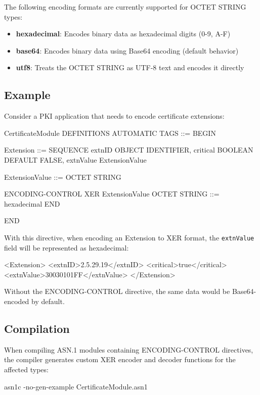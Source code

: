 \documentclass[english,oneside,12pt]{book}
\begin{document}
The following encoding formats are currently supported for OCTET STRING types:

\begin{itemize}
\item \textbf{hexadecimal}: Encodes binary data as hexadecimal digits (0-9, A-F)
\item \textbf{base64}: Encodes binary data using Base64 encoding (default behavior)
\item \textbf{utf8}: Treats the OCTET STRING as UTF-8 text and encodes it directly
\end{itemize}

\subsection*{Example}

Consider a PKI application that needs to encode certificate extensions:

\begin{asn}
CertificateModule DEFINITIONS AUTOMATIC TAGS ::= BEGIN

Extension ::= SEQUENCE {
    extnID      OBJECT IDENTIFIER,
    critical    BOOLEAN DEFAULT FALSE,
    extnValue   ExtensionValue
}

ExtensionValue ::= OCTET STRING

ENCODING-CONTROL XER
    ExtensionValue OCTET STRING ::= hexadecimal
END

END
\end{asn}

With this directive, when encoding an Extension to XER format, the \texttt{extnValue} 
field will be represented as hexadecimal:

\begin{example}
<Extension>
    <extnID>2.5.29.19</extnID>
    <critical>true</critical>
    <extnValue>30030101FF</extnValue>
</Extension>
\end{example}

Without the ENCODING-CONTROL directive, the same data would be Base64-encoded by default.

\subsection*{Compilation}

When compiling ASN.1 modules containing ENCODING-CONTROL directives, the compiler 
generates custom XER encoder and decoder functions for the affected types:

\begin{bash}
asn1c -no-gen-example CertificateModule.asn1
\end{bash}
\end{document}
